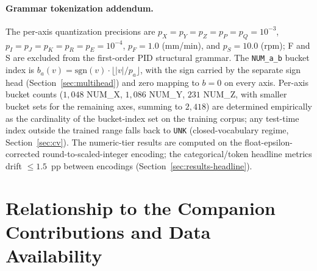 \documentclass[sensors,article,submit,moreauthors,pdftex]{Definitions/mdpi}
\begin{document}
\paragraph{Grammar tokenization addendum.} The per-axis quantization precisions are $p_X\!=\!p_Y\!=\!p_Z\!=\!p_P\!=\!p_Q\!=\!10^{-3}$, $p_I\!=\!p_J\!=\!p_K\!=\!p_R\!=\!p_E\!=\!10^{-4}$, $p_F\!=\!1.0$ (mm/min), and $p_S\!=\!10.0$ (rpm); F and S are excluded from the first-order PID structural grammar. The \texttt{NUM\_a\_b} bucket index is $b_a(v) = \mathrm{sgn}(v)\cdot\lfloor |v|/p_a \rfloor$, with the sign carried by the separate sign head (Section~\ref{sec:multihead}) and zero mapping to $b\!=\!0$ on every axis. Per-axis bucket counts ($1{,}048$ NUM\_X, $1{,}086$ NUM\_Y, $231$ NUM\_Z, with smaller bucket sets for the remaining axes, summing to $2{,}418$) are determined empirically as the cardinality of the bucket-index set on the training corpus; any test-time index outside the trained range falls back to \texttt{UNK} (closed-vocabulary regime, Section~\ref{sec:cv}). The numeric-tier results are computed on the float-epsilon-corrected round-to-scaled-integer encoding; the categorical/token headline metrics drift $\le\!1.5$~pp between encodings (Section~\ref{sec:results-headline}).


\section{Relationship to the Companion Contributions and Data Availability}
\label{app:companion}
\end{document}
